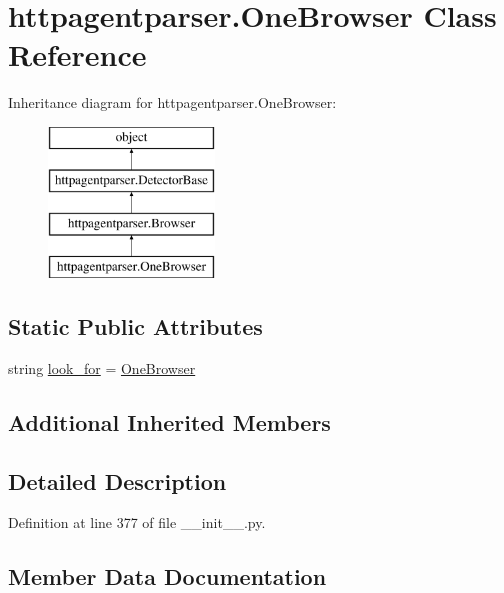 \hypertarget{classhttpagentparser_1_1_one_browser}{}\section{httpagentparser.\+One\+Browser Class Reference}
\label{classhttpagentparser_1_1_one_browser}
Inheritance diagram for httpagentparser.\+One\+Browser\+:\begin{figure}[H]
\begin{center}
\leavevmode
\includegraphics[height=4.000000cm]{classhttpagentparser_1_1_one_browser}
\end{center}
\end{figure}
\subsection*{Static Public Attributes}
\begin{DoxyCompactItemize}
\item 
string \hyperlink{classhttpagentparser_1_1_one_browser_acd972bec81c4a663acf877ed68744a59}{look\+\_\+for} = \textquotesingle{}\hyperlink{classhttpagentparser_1_1_one_browser}{One\+Browser}\textquotesingle{}
\end{DoxyCompactItemize}
\subsection*{Additional Inherited Members}


\subsection{Detailed Description}


Definition at line 377 of file \+\_\+\+\_\+init\+\_\+\+\_\+.\+py.



\subsection{Member Data Documentation}
\hypertarget{classhttpagentparser_1_1_one_browser_acd972bec81c4a663acf877ed68744a59}{}\label{classhttpagentparser_1_1_one_browser_acd972bec81c4a663acf877ed68744a59} 
